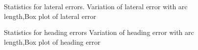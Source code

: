 \documentclass[sn-mathphys]{sn-jnl}%
\theoremstyle{thmstyleone}%
\theoremstyle{thmstyletwo}%
\theoremstyle{thmstylethree}%
\begin{document}
\begin{figure}[!htbp]
	\centering
	\quad
	
	\caption{Statistics for lateral errors. \protect{}  Variation of lateral error with arc length,\protect{}Box plot of lateral error }  
	\label{Fig:Statistics2}
\end{figure}

\begin{figure}[!htbp]
	\centering
	\quad
	
	\caption{Statistics for heading errors \protect{} Variation of heading error with arc length,\protect{}Box plot of heading error}
	\label{Fig:Statistics3}
\end{figure}
\end{document}
